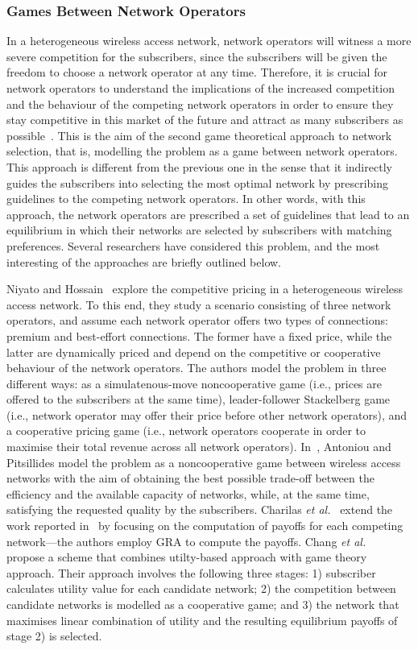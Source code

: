 \subsubsection{Games Between Network Operators} %
\label{ssub:games_between_network_operators}
In a heterogeneous wireless access network, network operators will witness a more severe competition for the subscribers, since the subscribers will be given the freedom to choose a network operator at any time. Therefore, it is crucial for network operators to understand the implications of the increased competition and the behaviour of the competing network operators in order to ensure they stay competitive in this market of the future and attract as many subscribers as possible~\cite{LushengKuo2013}. This is the aim of the second game theoretical approach to network selection, that is, modelling the problem as a game between network operators. This approach is different from the previous one in the sense that it indirectly guides the subscribers into selecting the most optimal network by prescribing guidelines to the competing network operators. In other words, with this approach, the network operators are prescribed a set of guidelines that lead to an equilibrium in which their networks are selected by subscribers with matching preferences. Several researchers have considered this problem, and the most interesting of the approaches are briefly outlined below.

Niyato and Hossain~\cite{NiyatoHossain2008} explore the competitive pricing in a heterogeneous wireless access network. To this end, they study a scenario consisting of three network operators, and assume each network operator offers two types of connections: premium and best-effort connections. The former have a fixed price, while the latter are dynamically priced and depend on the competitive or cooperative behaviour of the network operators. The authors model the problem in three different ways: as a simulatenous-move noncooperative game (i.e., prices are offered to the subscribers at the same time), leader-follower Stackelberg game (i.e., network operator may offer their price before other network operators), and a cooperative pricing game (i.e., network operators cooperate in order to maximise their total revenue across all network operators). In~\cite{Antoniou07}, Antoniou and Pitsillides model the problem as a noncooperative game between wireless access networks with the aim of obtaining the best possible trade-off between the efficiency and the available capacity of networks, while, at the same time, satisfying the requested quality by the subscribers. Charilas \emph{et al.}~\cite{Charilas08,Charilas2009} extend the work reported in~\cite{Antoniou07} by focusing on the computation of payoffs for each competing network---the authors employ GRA to compute the payoffs. Chang \emph{et al.}~\cite{Chang09} propose a scheme that combines utilty-based approach with game theory approach. Their approach involves the following three stages: 1) subscriber calculates utility value for each candidate network; 2) the competition between candidate networks is modelled as a cooperative game; and 3) the network that maximises linear combination of utility and the resulting equilibrium payoffs of stage 2) is selected.

